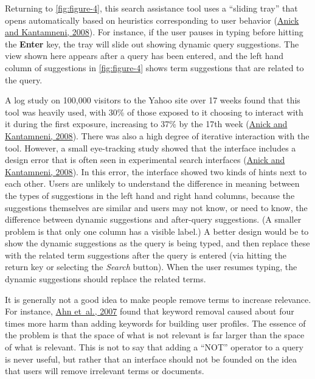 \documentclass[sigconf,nonacm,screen,pbalance]{acmart}
\begin{document}
Returning to \autoref{fig:figure-4}, this
search assistance tool uses a ``sliding tray'' that opens automatically based on heuristics corresponding
to user behavior (\href{https://searchuserinterfaces.com/book/sui_references.html#anick2008als}{Anick and Kantamneni, 2008}). For instance, if the user pauses in typing
before hitting the {\bf  Enter} key, the tray will slide out showing dynamic query suggestions. The
view shown here appears after a query has been entered, and the left hand column of suggestions in
\autoref{fig:figure-4}
shows term suggestions that are related to the query.

A log study on 100,000 visitors to the Yahoo site over 17 weeks found that this tool was heavily used,
with 30\% of those exposed to it choosing to interact with it during the first exposure, increasing to
37\% by the 17th week (\href{https://searchuserinterfaces.com/book/sui_references.html#anick2008als}{Anick and Kantamneni, 2008}). There was also a high degree of iterative
interaction with the tool. However, a small eye-tracking study showed that the interface includes a
design error that is often seen in experimental search interfaces (\href{https://searchuserinterfaces.com/book/sui_references.html#anick2008als}{Anick and Kantamneni, 2008}). In this error, the interface showed two
kinds of hints next to each other. Users are unlikely to understand the difference in meaning between
the types of suggestions in the left hand and right hand columns, because the suggestions themselves are
similar and users may not know, or need to know, the difference between dynamic suggestions and
after-query suggestions. (A smaller problem is that only one column has a visible label.) A better
design would be to show the dynamic suggestions as the query is being typed, and then replace these with
the related term suggestions after the query is entered (via hitting the return key or selecting the {\em 
Search} button). When the user resumes typing, the dynamic suggestions should replace the related
terms.

It is generally not a good idea to make people remove terms to increase relevance. For instance, \href{https://searchuserinterfaces.com/book/sui_references.html#ahn2007}{Ahn et~al., 2007} found that keyword removal caused about four times more harm
than adding keywords for building user profiles. The essence of the problem is that the space of what is
not relevant is far larger than the space of what is relevant. This is not to say that adding a ``NOT''
operator to a query is never useful, but rather that an interface should not be founded on the idea that
users will remove irrelevant terms or documents.
\end{document}
